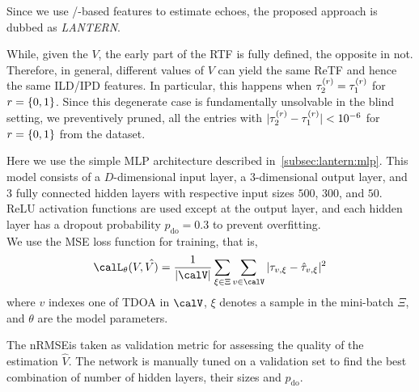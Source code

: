 \mynewline
Since we use \ReTF/-based features to estimate echoes, the proposed approach is dubbed as \textit{\acf{LANTERN}}.

\mynewline
While, given the $V$, the early part of the \ac{RTF} is fully defined, the opposite in not.
Therefore, in general, different values of $V$ can yield the same \ac{ReTF} and hence the same \ac{ILD}/\ac{IPD} features.
In particular, this happens when $\tau_2^{(r)} = \tau_1^{(r)}$ for $\idxEch=\set{0,1}$.
Since this degenerate case is fundamentally unsolvable in the blind setting, we preventively pruned, all the entries with $| \tau_2^{(r)} - \tau_1^{(r)} | < 10^{-6}$ for $\idxEch=\set{0,1}$ from the dataset.

\mynewline
Here we use the simple \ac{MLP} architecture described in~\cref{subsec:lantern:mlp}.
This model consists of a $D$-dimensional input layer, a 3-dimensional output layer, and 3 fully connected hidden layers with respective input sizes $500$, $300$, and $50$.
\ac{ReLU} activation functions are used except at the output layer, and each hidden layer has a dropout probability $p_\text{do} = 0.3$ to prevent overfitting.
\\We use the \ac{MSE} loss function for training, that is,
\begin{equation}\label{eq:lantern:mlploss}
    \calL_\theta(V, \hat{V)} = \frac{1}{|\calV|} \sum_{\xi\in\Xi} \sum_{v\in\calV} \powerOf{\tau_{v, \xi} - \hat{\tau}_{v, \xi}}
\end{equation}
where $v$ indexes one of \ac{TDOA} in $\calV$, $\xi$ denotes a sample in the mini-batch $\Xi$, and $\theta$ are the model parameters.

\mynewline
The \acf{nRMSE}is taken as validation metric for assessing the quality of the estimation $\hat{V}$.
The network is manually tuned on a validation set to find the best combination of number of hidden layers, their sizes and $p_\text{do}$.

